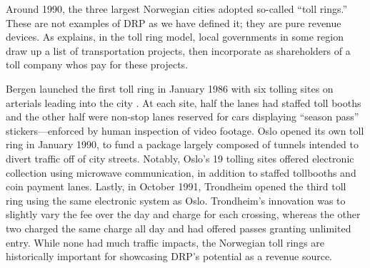 Around 1990, the three largest Norwegian cities adopted so-called ``toll rings.'' These are not examples of DRP as we have defined it; they are pure revenue devices. As \citet{Ieromonachou2006} explains, in the toll ring model, local governments in some region draw up a list of transportation projects, then incorporate as shareholders of a toll company whos pay for these projects.
 
 Bergen launched the first toll ring in January 1986 with six tolling sites on arterials leading into the city \citep{Ieromonachou2006,Ramjerdi2004,Gomez-Ibanez1994}. At each site, half the lanes had staffed toll booths and the other half were non-stop lanes reserved for cars displaying ``season pass'' stickers---enforced by human inspection of video footage. Oslo opened its own toll ring in January 1990, to fund a package largely composed of tunnels intended to divert traffic off of city streets. Notably, Oslo's 19 tolling sites offered electronic collection using microwave communication, in addition to staffed tollbooths and coin payment lanes. Lastly, in October 1991, Trondheim opened the third toll ring using the same electronic system as Oslo. Trondheim's innovation was to slightly vary the fee over the day and charge for each crossing, whereas the other two charged the same charge all day and had offered passes granting unlimited entry. While none had much traffic impacts, the Norwegian toll rings are historically important for showcasing DRP's potential as a revenue source.

